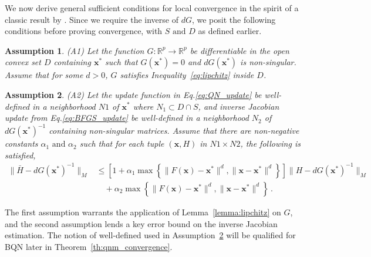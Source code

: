 \documentclass{statsoc}
\newtheorem{assumption}{Assumption}
\newcommand{\bx}{\boldsymbol{x}}
\begin{document}
We now derive general sufficient conditions for local convergence in the spirit of a classic result  by \cite{broyden1973local}. Since we require the inverse of $dG$, we posit the following conditions before proving convergence, with $S \text{ and } D$ as defined earlier.

\begin{assumption} \label{ass1}
(A1) Let the function $G: \mathbb{R}^p \to \mathbb{R}^p$ be differentiable in the open convex set $D$ containing $\bx^\ast$ such that $G(\bx^\ast)=0$ and $dG(\bx^\ast)$ is non-singular. Assume that for some $d > 0$, $G$ satisfies Inequality~\eqref{eq:lipchitz} inside $D$.
\end{assumption}

\begin{assumption} \label{ass2}
(A2) %
Let the update function in Eq.\eqref{eq:QN_update} be well-defined in a neighborhood $N1$ of $\bx^\ast$ where $N_1 \subset D \cap S$, and inverse Jacobian update from Eq.\eqref{eq:BFGS_update} be well-defined in a neighborhood $N_2$ of $dG(\bx^\ast)^{-1}$ containing non-singular matrices. Assume that there are non-negative constants $\alpha_1 \text{ and } \alpha_2$ such that for each tuple $(\bx,H)$ in $N1 \times N2$, the following is satisfied,
\begin{align} 
    \|\bar{H} - dG(\bx^\ast)^{-1}\|_M &\leq \left[1 + \alpha_1 \max\left\{\|F(\bx) - \bx^\ast\|^d, \|\bx - \bx^\ast\|^d\right\}\right]\|H - dG(\bx^\ast)^{-1}\|_M \nonumber \\
    & \quad + \alpha_2 \max\left\{\|F(\bx) - \bx^\ast\|^d, \|\bx-\bx^\ast\|^d\right\} \label{eq:jacobian_error}\,.
\end{align}
\end{assumption}
The first assumption warrants the application of Lemma~\ref{lemma:lipchitz} on $G$, and the second assumption lends a key error bound on the inverse Jacobian estimation. The notion of well-defined used in Assumption~\ref{ass2} will be qualified for BQN later in Theorem~\ref{th:qnm_convergence}. 
\end{document}
